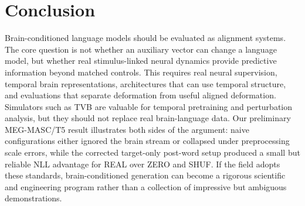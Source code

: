\documentclass{article}
\begin{document}
\section{Conclusion}

Brain-conditioned language models should be evaluated as alignment systems.
The core question is not whether an auxiliary vector can change a language model, but whether real stimulus-linked neural dynamics provide predictive information beyond matched controls.
This requires real neural supervision, temporal brain representations, architectures that can use temporal structure, and evaluations that separate deformation from useful aligned deformation.
Simulators such as TVB are valuable for temporal pretraining and perturbation analysis, but they should not replace real brain-language data.
Our preliminary MEG-MASC/T5 result illustrates both sides of the argument: naive configurations either ignored the brain stream or collapsed under preprocessing scale errors, while the corrected target-only post-word setup produced a small but reliable NLL advantage for REAL over ZERO and SHUF.
If the field adopts these standards, brain-conditioned generation can become a rigorous scientific and engineering program rather than a collection of impressive but ambiguous demonstrations.



\end{document}
